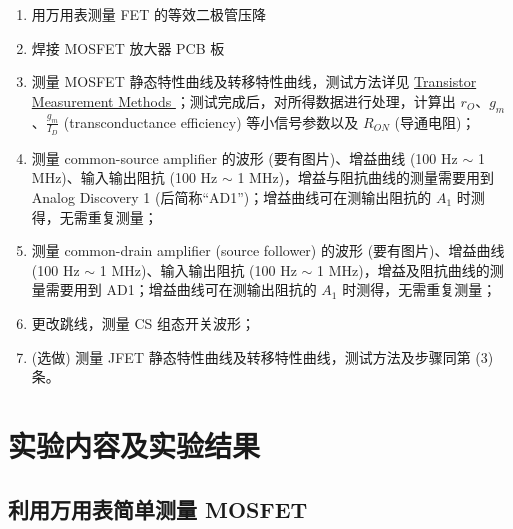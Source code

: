 \documentclass[UTF8]{article}
\begin{document}
\begin{enumerate}
\item 用万用表测量 FET 的等效二极管压降
\item 焊接 MOSFET 放大器 PCB 板
\item 测量 MOSFET 静态特性曲线及转移特性曲线，测试方法详见 %
    \href{https://yidingg.github.io/YiDingg/\#/Blogs/Electronics/Transistor\%20Measurement\%20Methods
    }{ %
    Transistor Measurement Methods
    }；测试完成后，对所得数据进行处理，计算出 $r_O$、$g_m$、$\frac{g_m}{I_D}$ (transconductance efficiency) 等小信号参数以及 $R_{ON}$ (导通电阻)；
\item 测量 common-source amplifier 的波形 (要有图片)、增益曲线 (100 Hz $\sim$ 1 MHz)、输入输出阻抗 (100 Hz $\sim$ 1 MHz)，增益与阻抗曲线的测量需要用到 Analog Discovery 1 (后简称``AD1'')；增益曲线可在测输出阻抗的 $A_1$ 时测得，无需重复测量；
\item 测量 common-drain amplifier (source follower) 的波形 (要有图片)、增益曲线 (100 Hz $\sim$ 1 MHz)、输入输出阻抗 (100 Hz $\sim$ 1 MHz)，增益及阻抗曲线的测量需要用到 AD1；增益曲线可在测输出阻抗的 $A_1$ 时测得，无需重复测量；
\item 更改跳线，测量 CS 组态开关波形；
\item (选做) 测量 JFET 静态特性曲线及转移特性曲线，测试方法及步骤同第 (3) 条。
\end{enumerate}

\section{实验内容及实验结果}

\subsection{利用万用表简单测量 MOSFET}
\end{document}

